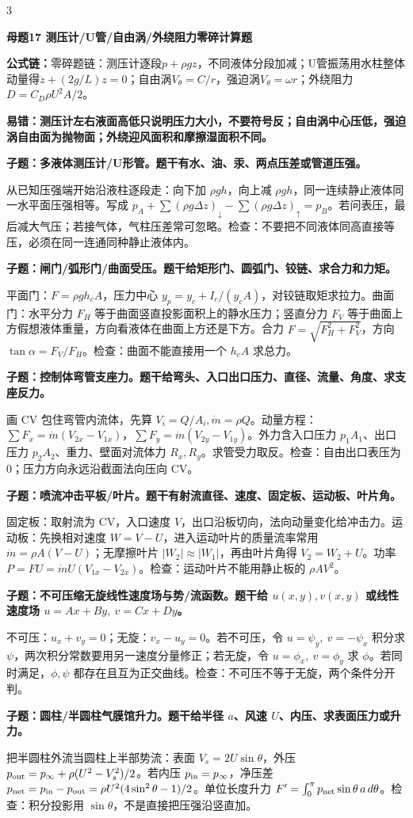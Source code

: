 \documentclass[a4paper]{article}
\newcommand{\mt}[1]{\vspace{0.22pt}\colorbox{M}{\parbox{\dimexpr\linewidth-2\fboxsep}{\color{white}\bfseries #1}}\par}
\newcommand{\qt}[1]{\vspace{0.10pt}\colorbox{Q}{\parbox{\dimexpr\linewidth-2\fboxsep}{\color{white}\bfseries #1}}\par}
\newcommand{\ans}[1]{\colorbox{G}{\parbox{\dimexpr\linewidth-2\fboxsep}{#1}}\par}
\newcommand{\warn}[1]{\colorbox{Y}{\parbox{\dimexpr\linewidth-2\fboxsep}{\color{E}\bfseries #1}}\par}
\newcommand{\form}[1]{{\color{M}\bfseries 公式链：}#1\par}
\begin{document}
\begin{multicols}{3}
\mt{母题17 测压计/U管/自由涡/外绕阻力零碎计算题}
\form{零碎题链：测压计逐段$p+\rho gz$，不同液体分段加减；U管振荡用水柱整体动量得$\ddot z+(2g/L)z=0$；自由涡$V_\theta=C/r$，强迫涡$V_\theta=\omega r$；外绕阻力$D=C_D\rho U^2A/2$。}
\warn{易错：测压计左右液面高低只说明压力大小，不要符号反；自由涡中心压低，强迫涡自由面为抛物面；外绕迎风面积和摩擦湿面积不同。}
\qt{子题：多液体测压计/U形管。题干有水、油、汞、两点压差或管道压强。}
\ans{从已知压强端开始沿液柱逐段走：向下加 $\rho gh$，向上减 $\rho gh$，同一连续静止液体同一水平面压强相等。写成 $p_A+\sum(\rho g\Delta z)_{\downarrow}-\sum(\rho g\Delta z)_{\uparrow}=p_B$。若问表压，最后减大气压；若接气体，气柱压差常可忽略。检查：不要把不同液体同高直接等压，必须在同一连通同种静止液体内。}
\qt{子题：闸门/弧形门/曲面受压。题干给矩形门、圆弧门、铰链、求合力和力矩。}
\ans{平面门：$F=\rho gh_cA$，压力中心 $y_p=y_c+I_c/(y_cA)$，对铰链取矩求拉力。曲面门：水平分力 $F_H$ 等于曲面竖直投影面积上的静水压力；竖直分力 $F_V$ 等于曲面上方假想液体重量，方向看液体在曲面上方还是下方。合力 $F=\sqrt{F_H^2+F_V^2}$，方向 $\tan\alpha=F_V/F_H$。检查：曲面不能直接用一个 $h_cA$ 求总力。}
\qt{子题：控制体弯管支座力。题干给弯头、入口出口压力、直径、流量、角度、求支座反力。}
\ans{画 CV 包住弯管内流体，先算 $V_i=Q/A_i,\dot m=\rho Q$。动量方程：$\sum F_x=\dot m(V_{2x}-V_{1x})$，$\sum F_y=\dot m(V_{2y}-V_{1y})$。外力含入口压力 $p_1A_1$、出口压力 $p_2A_2$、重力、壁面对流体力 $R_x,R_y$。求管受力取反。检查：自由出口表压为0；压力方向永远沿截面法向压向 CV。}
\qt{子题：喷流冲击平板/叶片。题干有射流直径、速度、固定板、运动板、叶片角。}
\ans{固定板：取射流为 CV，入口速度 $V$，出口沿板切向，法向动量变化给冲击力。运动板：先换相对速度 $W=V-U$，进入运动叶片的质量流率常用 $\dot m=\rho A(V-U)$；无摩擦叶片 $|W_2|\approx |W_1|$，再由叶片角得 $V_2=W_2+U$。功率 $P=FU=\dot mU(V_{1x}-V_{2x})$。检查：运动叶片不能用静止板的 $\rho AV^2$。}
\qt{子题：不可压缩无旋线性速度场与势/流函数。题干给 $u(x,y),v(x,y)$ 或线性速度场 $u=Ax+By,\ v=Cx+Dy$。}
\ans{不可压：$u_x+v_y=0$；无旋：$v_x-u_y=0$。若不可压，令 $u=\psi_y,\ v=-\psi_x$ 积分求 $\psi$，两次积分常数要用另一速度分量修正；若无旋，令 $u=\phi_x,\ v=\phi_y$ 求 $\phi$。若同时满足，$\phi,\psi$ 都存在且互为正交曲线。检查：不可压不等于无旋，两个条件分开判。}
\qt{子题：圆柱/半圆柱气膜馆升力。题干给半径 $a$、风速 $U$、内压、求表面压力或升力。}
\ans{把半圆柱外流当圆柱上半部势流：表面 $V_s=2U\sin\theta$，外压 $p_{\rm out}=p_\infty+\rho(U^2-V_s^2)/2$。若内压 $p_{\rm in}=p_\infty$，净压差 $p_{\rm net}=p_{\rm in}-p_{\rm out}=\rho U^2(4\sin^2\theta-1)/2$。单位长度升力 $F'=\int_0^\pi p_{\rm net}\sin\theta\,a\,d\theta$。检查：积分投影用 $\sin\theta$，不是直接把压强沿竖直加。}

\end{multicols}
\end{document}
